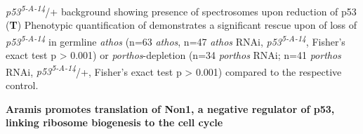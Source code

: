\documentclass[12pt,oneside]{reedthesis}
\begin{document}
\emph{p53\textsuperscript{5-A-14}}/+ background showing presence of spectrosomes upon reduction of p53 (\textbf{T}) Phenotypic quantification of demonstrates a significant rescue upon of loss of \emph{p53\textsuperscript{5-A-14}} in germline \emph{athos} (n=63 \emph{athos}, n=47 \emph{athos} RNAi, \emph{p53\textsuperscript{5-A-14}}, Fisher's exact test p \textgreater{} 0.001) or \emph{porthos}-depletion (n=34 \emph{porthos} RNAi; n=41 \emph{porthos} RNAi, \emph{p53\textsuperscript{5-A-14}}/+, Fisher's exact test p \textgreater{} 0.001) compared to the respective control.

\setlength\parindent{24pt}

\textbf{\hfill\break
}

\textbf{Aramis promotes translation of Non1, a negative regulator of p53, linking ribosome biogenesis to the cell cycle}
\end{document}
